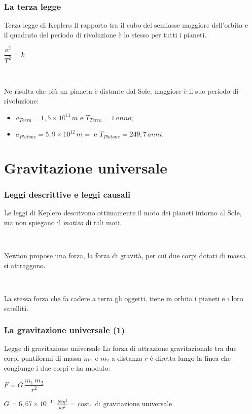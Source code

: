 \documentclass[]{beamer}
\theoremstyle{plain}
\begin{document}
\begin{frame}
\frametitle{La terza legge}
\begin{block}{Terza legge di Keplero}
Il rapporto tra il cubo del semiasse maggiore dell'orbita e il quadrato del periodo di rivoluzione è lo stesso per tutti i pianeti.
\begin{center}
\colorbox{marroncino!30}{$ \dfrac{a^3}{T^2}=k $}
\end{center}
\end{block}\pause

~

Ne risulta che più un pianeta è distante dal Sole, maggiore è il suo periodo di rivoluzione: 
\begin{itemize}
  \item $ a_{Terra} = 1,5 \times 10^{11} \, m $ e $ T_{Terra} = 1 \, anno $;\pause
  \item $ a_{Plutone} = 5,9 \times 10^{12} \, m = $ e $ T_{Plutone} = 249,7 \, anni $.
\end{itemize}
\begin{center}
\href{gif/keplero3.gif}{}
\end{center}
\end{frame}





\section{Gravitazione universale}






\begin{frame}
\frametitle{Leggi descrittive e leggi causali}
Le leggi di Keplero descrivono ottimamente il moto dei pianeti intorno al Sole, ma non spiegano il \emph{motivo} di tali moti.\pause

~

Newton propose una forza, la \alert{forza di gravità}, per cui due corpi dotati di massa si attraggono.\pause

~

La stessa forza che fa cadere a terra gli oggetti, tiene in orbita i pianeti e i loro satelliti.
\end{frame}



\begin{frame}
\frametitle{La gravitazione universale (1)}
\begin{block}{Legge di gravitazione universale}
La forza di attrazione gravitazionale tra due corpi puntiformi di massa $ m_1 $ e $ m_2 $ a distanza $ r $ è diretta lungo la linea che congiunge i due corpi e ha modulo:
\begin{center}
\colorbox{marroncino!30}{$ F = G \,  \dfrac{m_1 \, m_2}{r^2} $}
\end{center}
$ G = 6,67 \times 10^{-11} \, \frac{Nm^2}{kg^2}$ =  cost.~di gravitazione universale
\end{block}
\end{frame}
\end{document}

